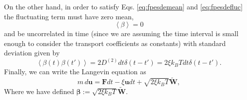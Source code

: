 \documentclass[ twoside,openright,titlepage,numbers=noenddot,%
headinclude,footinclude,cleardoublepage=empty,abstract=on,
BCOR=5mm,paper=b5,fontsize=11pt, dvipsnames
]{scrreprt}
\renewcommand{\vec}[1]{\bm{#1}}
\newcommand{\kT}{k_B T}
\newcommand{\noise}{\widetilde{W}}
\newcommand{\pvel}{u}
\begin{document}
On the other hand, in order to satisfy Eqs. \eqref{eq:fpesdemean} and \eqref{eq:fpesdefluc} the fluctuating term must have zero mean,
\begin{equation}
  \label{eq:noisemean}
  \left\langle\beta\right\rangle = 0
\end{equation}
and be uncorrelated in time (since we are assuming the time interval is small enough to consider the transport coefficients as constants) with standard deviation given by
\begin{equation}
  \label{eq:noiseautocorr}
  \left\langle\beta(t)\beta(t')\right\rangle = 2D^{(2)}dt\delta(t-t') = 2\xi\kT dt\delta(t-t').
\end{equation}
Finally, we can write the Langevin equation as
\begin{equation}
  \label{eq:langevinfull}
  m\, d\vec{\pvel} = \vec{F}dt - \xi\vec{\pvel}dt +  \sqrt{2\xi\kT}\vec{\noise},
\end{equation}
Where we have defined $\vec{\beta} := \sqrt{2\xi\kT}\vec{\noise}$.
\end{document}
